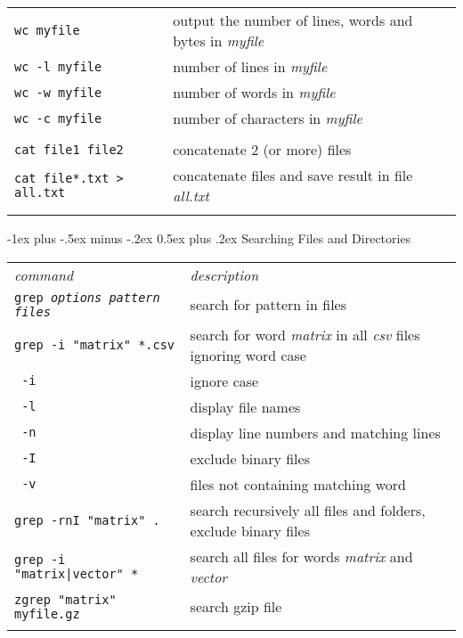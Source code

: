 \documentclass[10pt,landscape]{article}
\makeatletter
\renewcommand{\section}{\@startsection{section}{1}{0mm}%
                                {-1ex plus -.5ex minus -.2ex}%
                                {0.5ex plus .2ex}%
                                {\normalfont\large\bfseries}}
\makeatother
\begin{document}
\begin{multicols}{2}
\begin{tabular}{ll}
\texttt{wc myfile} & output the number of lines, words and bytes in \textit{myfile} \\
\texttt{wc -l myfile} & number of lines in \textit{myfile} \\
\texttt{wc -w myfile} & number of words in \textit{myfile} \\
\texttt{wc -c myfile} & number of characters in \textit{myfile} \\\\
\texttt{cat file1 file2} & concatenate 2 (or more) files \\
\texttt{cat file*.txt > all.txt} & concatenate files and save result in file \textit{all.txt} \\

\\
\end{tabular}


\section{Searching Files and Directories}
\begin{tabular}{ll}

\emph{command} & \emph{description} \\

\texttt{grep \textit{options pattern files}} & search for pattern in files\\
\texttt{grep -i "matrix" *.csv} & search for word \textit{matrix} in all \textit{csv} files ignoring word case\\
\texttt{\hspace*{6mm} -i} & ignore case\\
\texttt{\hspace*{6mm} -l} & display file names\\
\texttt{\hspace*{6mm} -n} & display line numbers and matching lines\\
\texttt{\hspace*{6mm} -I} & exclude binary files\\
\texttt{\hspace*{6mm} -v} & files not containing matching word\\
\texttt{grep -rnI "matrix" .} & search recursively all files and folders, exclude binary files\\
\texttt{grep -i "matrix|vector" *} & search all files for words \textit{matrix} and \textit{vector} \\
\texttt{zgrep "matrix" myfile.gz} & search gzip file\\
\\


\end{tabular}
\end{multicols}
\end{document}
